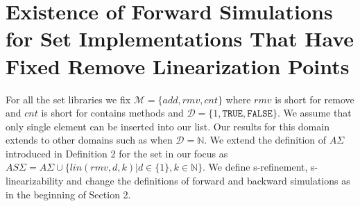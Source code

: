 \section{Existence of Forward Simulations for Set Implementations That Have Fixed Remove Linearization Points }
For all the set libraries we fix $\mathcal{M} = \{ add, rmv, cnt\}$ where $rmv$ is short for remove and $cnt$ is short for contains methods and $\mathcal{D} = \{1, \texttt{TRUE}, \texttt{FALSE} \}$. We assume that only single element can be inserted into our list. Our results for this domain extends to other domains such as when $\mathcal{D} = \mathbb{N}$. We extend the definition of $A\Sigma$ introduced in Definition 2 for the set in our focus as $AS\Sigma = A\Sigma \cup \{lin(rmv,d,k)| d \in \{1\}, k \in \mathbb{N}\}$. We define s-refinement, s-linearizability and change the definitions of forward and backward simulations as in the beginning of Section 2.

